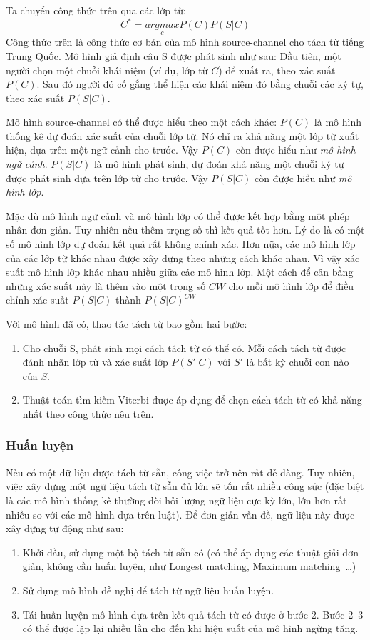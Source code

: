 \documentclass[a4paper,oneside,14pt]{extbook} %
\begin{document}
Ta chuyển công thức trên qua các lớp từ:
$$C^*=\underset{c}{argmax}P(C)P(S|C)$$
Công thức trên là công thức cơ bản của mô hình source-channel cho tách
từ tiếng Trung Quốc. Mô hình giả định câu S được phát sinh như sau:
Đầu tiên, một người chọn một chuỗi khái niệm (ví dụ, lớp từ $C$) để
xuất ra, theo xác suất $P(C)$. Sau đó người đó cố gắng thể hiện các
khái niệm đó bằng chuỗi các ký tự, theo xác suất $P(S|C)$.

Mô hình source-channel có thể được hiểu theo một cách khác: $P(C)$ là
mô hình thống kê dự đoán xác suất của chuỗi lớp từ. Nó chỉ ra khả năng
một lớp từ xuất hiện, dựa trên một ngữ cảnh cho trước. Vậy $P(C)$ còn
được hiểu như {\em mô hình ngữ cảnh}. $P(S|C)$ là mô hình phát sinh,
dự đoán khả năng một chuỗi ký tự được phát sinh dựa trên lớp từ cho
trước. Vậy $P(S|C)$ còn được hiểu như {\em mô hình lớp}.

Mặc dù mô hình ngữ cảnh và mô hình lớp có thể được kết hợp bằng một
phép nhân đơn giản. Tuy nhiên nếu thêm trọng số thì kết quả tốt
hơn. Lý do là có một số mô hình lớp dự đoán kết quả rất không chính
xác. Hơn nữa, các mô hình lớp của các lớp từ khác nhau được xây dựng
theo những cách khác nhau. Vì vậy xác suất mô hình lớp khác nhau nhiều
giữa các mô hình lớp. Một cách để cân bằng những xác suất này là thêm
vào một trọng số $CW$ cho mỗi mô hình lớp để điều chỉnh xác suất
$P(S|C)$ thành $P(S|C)^{CW}$

Với mô hình đã có, thao tác tách từ bao gồm hai bước:
\begin{enumerate}
\item Cho chuỗi S, phát sinh mọi cách tách từ có thể có. Mỗi cách tách
  từ được đánh nhãn lớp từ và xác suất lớp $P(S'|C)$ với $S'$ là bất
  kỳ chuỗi con nào của $S$.
\item Thuật toán tìm kiếm Viterbi được áp dụng để chọn cách tách từ có
  khả năng nhất theo công thức nêu trên.
\end{enumerate}

\subsubsection{Huấn luyện}

Nếu có một dữ liệu được tách từ sẵn, công việc trở nên rất dễ
dàng. Tuy nhiên, việc xây dựng một ngữ liệu tách từ sẵn đủ lớn sẽ tốn
rất nhiều công sức (đặc biệt là các mô hình thống kê thường đòi hỏi
lượng ngữ liệu cực kỳ lớn, lớn hơn rất nhiều so với các mô hình dựa
trên luật). Để đơn giản vấn đề, ngữ liệu này được xây dựng tự động như
sau:
\begin{enumerate}
\item Khởi đầu, sử dụng một bộ tách từ sẵn có (có thể áp dụng các
  thuật giải đơn giản, không cần huấn luyện, như Longest matching,
  Maximum matching~\ldots{})
\item Sử dụng mô hình đề nghị để tách từ ngữ liệu huấn luyện.
\item Tái huấn luyện mô hình dựa trên kết quả tách từ có được ở bước
  2. Bước 2--3 có thể được lặp lại nhiều lần  cho đến khi hiệu suất của
  mô hình ngừng tăng.
\end{enumerate}
\end{document}
